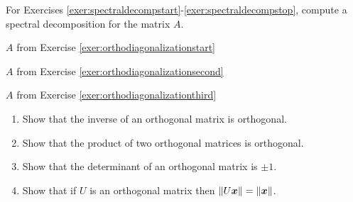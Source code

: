 \noindent For Exercises \ref{exer:spectraldecompstart}-\ref{exer:spectraldecompstop}, compute a spectral decomposition for the matrix $A$. 
\begin{enumerate}[!HW!, label=$\spadesuit$ \arabic*., ref=\arabic*]
\begin{multicols}{3}
\item\label{exer:spectraldecompstart} $A$ from Exercise \ref{exer:orthodiagonalizationstart} %
\item $A$ from Exercise \ref{exer:orthodiagonalizationsecond} %
\item\label{exer:spectraldecompstop} $A$ from Exercise \ref{exer:orthodiagonalizationthird} %
\end{multicols}
\end{enumerate}

\begin{enumerate}[!HW!]
\item Show that the inverse of an orthogonal matrix is orthogonal. \\ %
\item Show that the product of two orthogonal matrices is orthogonal.\\ %
\item Show that the determinant of an orthogonal matrix is $\pm 1$.\\ %
\item Show that if $U$ is an orthogonal matrix then $\Vert U\boldsymbol x\Vert = \Vert \boldsymbol x\Vert$. %
\end{enumerate}


 \mbox{}\vfill
 
\pagebreak